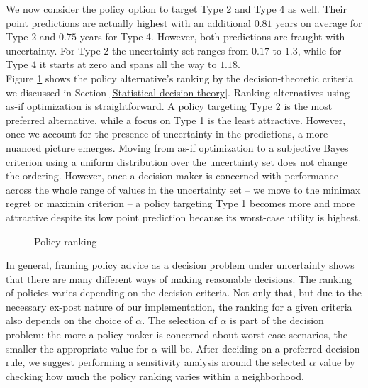 \noindent We now consider the policy option to target Type 2 and Type 4 as well. Their point predictions are actually highest with an additional $0.81$ years on average for Type 2 and $0.75$ years for Type 4. However, both predictions are fraught with uncertainty. For Type 2 the uncertainty set ranges from $0.17$ to $1.3$, while for Type 4 it starts at zero and spans all the way to $1.18$.\\

\noindent Figure \ref{Ranking} shows the policy alternative's ranking by the decision-theoretic criteria we discussed in Section \ref{Statistical decision theory}. Ranking alternatives using as-if optimization is straightforward. A policy targeting Type 2 is the most preferred alternative, while a focus on Type 1 is the least attractive. However, once we account for the presence of uncertainty in the predictions, a more nuanced picture emerges. Moving from as-if optimization to a subjective Bayes criterion using a uniform distribution over the uncertainty set does not change the ordering. However, once a decision-maker is concerned with performance across the whole range of values in the uncertainty set -- we move to the minimax regret or maximin criterion -- a policy targeting Type 1 becomes more and more attractive despite its low point prediction because its worst-case utility is highest.\\
%
\begin{figure}[h!]\centering
{}
\caption{Policy ranking}\label{Ranking}
\end{figure}\FloatBarrier
%
\noindent In general, framing policy advice as a decision problem under uncertainty shows that there are many different ways of making reasonable decisions. The ranking of policies varies depending on the decision criteria. Not only that, but due to the necessary ex-post nature of our implementation, the ranking for a given criteria also depends on the choice of $\alpha$. The selection of $\alpha$ is part of the decision problem: the more a policy-maker is concerned about worst-case scenarios, the smaller the appropriate value for $\alpha$ will be. After deciding on a preferred decision rule, we suggest performing a sensitivity analysis around the selected $\alpha$ value by checking how much the policy ranking varies within a neighborhood.
